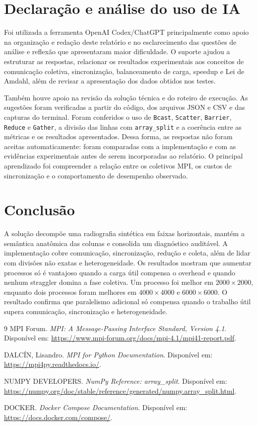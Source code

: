 \documentclass[12pt,a4paper]{article}
\begin{document}
\section{Declaração e análise do uso de IA}

Foi utilizada a ferramenta OpenAI Codex/ChatGPT principalmente como apoio na
organização e redação deste relatório e no esclarecimento das questões de
análise e reflexão que apresentaram maior dificuldade. O suporte ajudou a
estruturar as respostas, relacionar os resultados experimentais aos conceitos
de comunicação coletiva, sincronização, balanceamento de carga, speedup e Lei
de Amdahl, além de revisar a apresentação dos dados obtidos nos testes.

Também houve apoio na revisão da solução técnica e do roteiro de execução. As
sugestões foram verificadas a partir do código, dos arquivos JSON e CSV e das
capturas do terminal. Foram conferidos o uso de \texttt{Bcast},
\texttt{Scatter}, \texttt{Barrier}, \texttt{Reduce} e \texttt{Gather}, a
divisão das linhas com \texttt{array\_split} e a coerência entre as métricas e
os resultados apresentados. Dessa forma, as respostas não foram aceitas
automaticamente: foram comparadas com a implementação e com as evidências
experimentais antes de serem incorporadas ao relatório. O principal aprendizado
foi compreender a relação entre os coletivos MPI, os custos de sincronização e
o comportamento de desempenho observado.

\section{Conclusão}

A solução decompõe uma radiografia sintética em faixas horizontais, mantém a
semântica anatômica das colunas e consolida um diagnóstico auditável. A
implementação cobre comunicação, sincronização, redução e coleta, além de lidar
com divisões não exatas e heterogeneidade. Os resultados mostram que aumentar
processos só é vantajoso quando a carga útil compensa o overhead e quando nenhum
straggler domina a fase coletiva. Um processo foi melhor em
$2000\times2000$, enquanto dois processos foram melhores em $4000\times4000$ e
$6000\times6000$. O resultado confirma que paralelismo adicional só compensa
quando o trabalho útil supera comunicação, sincronização e heterogeneidade.

\begin{thebibliography}{9}
MPI Forum. \emph{MPI: A Message-Passing Interface Standard, Version 4.1}.
Disponível em: \url{https://www.mpi-forum.org/docs/mpi-4.1/mpi41-report.pdf}.

DALCÍN, Lisandro. \emph{MPI for Python Documentation}.
Disponível em: \url{https://mpi4py.readthedocs.io/}.

NUMPY DEVELOPERS. \emph{NumPy Reference: array\_split}.
Disponível em: \url{https://numpy.org/doc/stable/reference/generated/numpy.array_split.html}.

DOCKER. \emph{Docker Compose Documentation}.
Disponível em: \url{https://docs.docker.com/compose/}.
\end{thebibliography}
\end{document}
